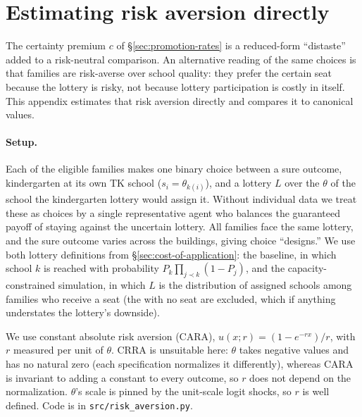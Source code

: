 \documentclass{article}
\begin{document}
\appendix
\section{Estimating risk aversion directly}
\label{sec:risk-aversion}
The certainty premium $c$ of \S\ref{sec:promotion-rates} is a reduced-form ``distaste'' added to a risk-neutral comparison. An alternative reading of the same choices is that families are risk-averse over school quality: they prefer the certain seat because the lottery is risky, not because lottery participation is costly in itself. This appendix estimates that risk aversion directly and compares it to canonical values.

\paragraph{Setup.} Each of the \numEligibleFamilies{} eligible families makes one binary choice between a sure outcome, kindergarten at its own TK school ($s_i = \theta_{k(i)}$), and a lottery $L$ over the $\theta$ of the school the kindergarten lottery would assign it. Without individual data we treat these as \numEligibleFamilies{} choices by a single representative agent who balances the guaranteed payoff of staying against the uncertain lottery. All families face the same lottery, and the sure outcome varies across the \numEligibleBuildings{} buildings, giving \numEligibleBuildings{} choice ``designs.'' We use both lottery definitions from \S\ref{sec:cost-of-application}: the baseline, in which school $k$ is reached with probability $P_k \prod_{j \prec k}(1 - P_j)$, and the capacity-constrained simulation, in which $L$ is the distribution of assigned schools among families who receive a seat (the \numSimNoSeat{} with no seat are excluded, which if anything understates the lottery's downside).

We use constant absolute risk aversion (CARA), $u(x; r) = (1 - e^{-r x}) / r$, with $r$ measured per unit of $\theta$. CRRA is unsuitable here: $\theta$ takes negative values and has no natural zero (each specification normalizes it differently), whereas CARA is invariant to adding a constant to every outcome, so $r$ does not depend on the normalization. $\theta$'s scale is pinned by the unit-scale logit shocks, so $r$ is well defined. Code is in \texttt{src/risk\_aversion.py}.
\end{document}
